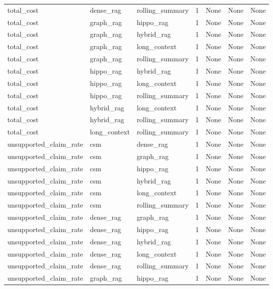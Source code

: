 \begin{tabular}{lllllll}
total\_cost & dense\_rag & rolling\_summary & 1 & None & None & None \\
total\_cost & graph\_rag & hippo\_rag & 1 & None & None & None \\
total\_cost & graph\_rag & hybrid\_rag & 1 & None & None & None \\
total\_cost & graph\_rag & long\_context & 1 & None & None & None \\
total\_cost & graph\_rag & rolling\_summary & 1 & None & None & None \\
total\_cost & hippo\_rag & hybrid\_rag & 1 & None & None & None \\
total\_cost & hippo\_rag & long\_context & 1 & None & None & None \\
total\_cost & hippo\_rag & rolling\_summary & 1 & None & None & None \\
total\_cost & hybrid\_rag & long\_context & 1 & None & None & None \\
total\_cost & hybrid\_rag & rolling\_summary & 1 & None & None & None \\
total\_cost & long\_context & rolling\_summary & 1 & None & None & None \\
unsupported\_claim\_rate & csm & dense\_rag & 1 & None & None & None \\
unsupported\_claim\_rate & csm & graph\_rag & 1 & None & None & None \\
unsupported\_claim\_rate & csm & hippo\_rag & 1 & None & None & None \\
unsupported\_claim\_rate & csm & hybrid\_rag & 1 & None & None & None \\
unsupported\_claim\_rate & csm & long\_context & 1 & None & None & None \\
unsupported\_claim\_rate & csm & rolling\_summary & 1 & None & None & None \\
unsupported\_claim\_rate & dense\_rag & graph\_rag & 1 & None & None & None \\
unsupported\_claim\_rate & dense\_rag & hippo\_rag & 1 & None & None & None \\
unsupported\_claim\_rate & dense\_rag & hybrid\_rag & 1 & None & None & None \\
unsupported\_claim\_rate & dense\_rag & long\_context & 1 & None & None & None \\
unsupported\_claim\_rate & dense\_rag & rolling\_summary & 1 & None & None & None \\
unsupported\_claim\_rate & graph\_rag & hippo\_rag & 1 & None & None & None \\

\end{tabular}
